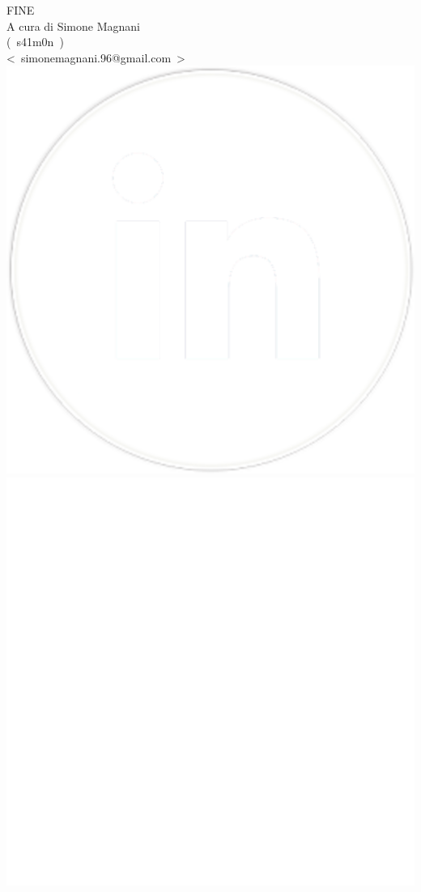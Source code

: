 \documentclass[12pt]{beamer}
\begin{document}
  \begin{frame}[standout]
  	FINE\\\vspace{1cm}
  	\begingroup
  		\footnotesize
  		A cura di Simone Magnani\\
  		(~s41m0n~)\\
  		<~simonemagnani.96@gmail.com~>\\[\baselineskip]
  		\includegraphics[scale=0.17]{res/Linkedin}
  		\includegraphics[scale=0.05]{res/GitHub}

\end{frame}
\end{document}
